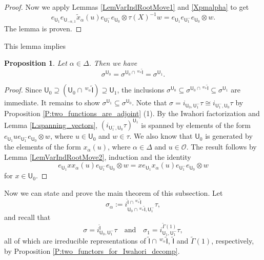 \documentclass[10pt, letterpaper]{amsart}
\theoremstyle{plain}
\newtheorem{Prop}[equation]{Proposition}
\theoremstyle{definition}
\numberwithin{equation}{section}
\newcommand{\xt}{\tilde{x}}
\newcommand{\Gammaft}{\widetilde{\mathsf{\Gamma}}}
\newcommand{\If}{\mathsf{I}}
\newcommand{\Uf}{\mathsf{U}}
\newcommand{\Gammaf}{\mathsf{\Gamma}}
\newcommand{\Ift}{\widetilde{\mathsf{I}}}
\newcommand{\qand}{{\quad\text{and}\quad}}
\begin{document}
\begin{proof}
	Now we apply Lemmas \ref{LemVarIndRootMove1} and \ref{Xpmalpha} to get 
		\begin{equation*}
		e_{{\Uf}_{1}}e_{{\Uf}_{-\alpha,1}}\xt_{\alpha}(u)e_{{\Uf}_{1}^{-}}e_{{\Uf}_{0}}\otimes \tau(X)^{-1}w = e_{{\Uf}_{1}}e_{{\Uf}_{1}^{-}}e_{{\Uf}_{0}}\otimes w.
	\end{equation*}
    The lemma is proven.
\end{proof}

This lemma implies
\begin{Prop}\label{UInvar}
	Let $\alpha\in \Delta$. Then we have 
	\begin{equation*}
		\sigma^{{\Uf_0}}=\sigma^{{\Uf_0}\cap \,^{w_{\alpha}}\widetilde{{\If}}}=\sigma^{{\Uf}_{1}}.
	\end{equation*}
\end{Prop}
\begin{proof}
Since $\Uf_0\supseteq (\Uf_0\cap \,^{w_{\alpha}}\widetilde{{\If}}) \supseteq \Uf_1$, the inclusions $\sigma^{{\Uf_{0}}}\subseteq\sigma^{{\Uf_{0}}\cap \,^{w_{\alpha}}\widetilde{{\If}}}\subseteq \sigma^{{\Uf}_{1}}$ are immediate. It remains to show $\sigma^{{\Uf}_{1}}\subseteq \sigma^{{\Uf_0}}$. Note that $\sigma=i_{\Uf_0, \Uf_1^-}\tau\cong i_{{\Uf}^{-}_{1},{\Uf_0}}\tau$ by Proposition \ref{P:two_functions_are_adjoint} (1). By the Iwahori factorization and Lemma \ref{L:spanning_vectors}, $(i_{{\Uf}^{-}_{1},{\Uf_0}}\tau)^{{\Uf}_{1}}$  is spanned by elements of the form $e_{{\Uf}_{1}}u e_{{\Uf}_{1}^{-}}e_{{\Uf}_{0}}\otimes w$, where $u\in {\Uf}_{0}$ and $w\in \tau$. We also know that ${\Uf}_{0}$ is generated by the elements of the form $x_{\alpha}(u)$, where $\alpha\in \Delta$ and $u\in \mathcal{O}$. The result follows by Lemma \ref{LemVarIndRootMove2}, induction and the identity
	\begin{equation*}
		e_{{\Uf}_{1}}xx_{\alpha}(u)e_{{\Uf}_{1}^{-}}e_{{\Uf}_{0}}\otimes w =xe_{{\Uf}_{1}}x_{\alpha}(u)e_{{\Uf}_{1}^{-}}e_{{\Uf}_{0}}\otimes w
	\end{equation*}
	for $x\in {\Uf}_{0}$.
\end{proof}

Now we can state and prove the main theorem of this subsection. Let 
\[
\sigma_{\alpha}:=i^{\widetilde{{\If}}\cap\,^{w_{\alpha}}\widetilde{{\If}}}_{{\Uf}_{0}\cap \,^{w_{\alpha}}\widetilde{{\If}},{\Uf}^{-}_{1}}\tau,
\]
and recall that 
\[
\sigma=i_{{\Uf_{0}},{\Uf}^{-}_{1}}^{\Ift}\tau\qand \sigma_{1}=i_{{\Uf}_{1},{\Uf}^{-}_{1}}^{\Gammaft(1)}\tau,
\]
all of which are irreducible representations of $\widetilde{{\If}}\cap\,^{w_{\alpha}}\widetilde{{\If}}$, $\widetilde{\If}$ and $\widetilde{\Gammaf}(1)$, respectively, by Proposition \ref{P:two_functors_for_Iwahori_decomp}.
\end{document}
